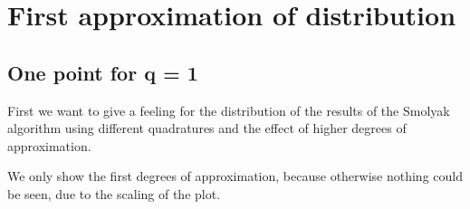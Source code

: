 \documentclass[letterpaper,10pt,english]{sphinxmanual}
\begin{document}
\section{First approximation of distribution}
\label{\detokenize{examples/Stat_evaluation_for_prob_quad :First-approximation-of-distribution}}

\subsection{One point for q = 1}
\label{\detokenize{examples/Stat_evaluation_for_prob_quad :One-point-for-q-=-1}}
First we want to give a feeling for the distribution of the results of the Smolyak algorithm using different quadratures and the effect of higher degrees of approximation.

We only show the first degrees of approximation, because otherwise nothing could be seen, due to the scaling of the plot.

{
\begin{sphinxVerbatim}[commandchars=\\\{\}]
\llap{\color{nbsphinxin}[11]:\,\hspace{\fboxrule}\hspace{\fboxsep}}
  
  
\end{sphinxVerbatim}
}
\end{document}
